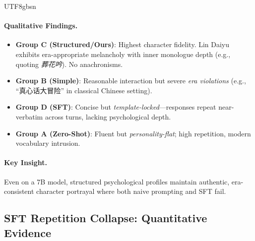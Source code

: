\documentclass[11pt]{article}
\begin{document}
\begin{CJK*}{UTF8}{gbsn}
\begin{table}[h]
\centering
\small
{}
\caption{Prompt engineering ablation on Qwen 7B. Response length in characters.}
\label{tab:prompt_ablation_full}
\end{table}

\paragraph{Qualitative Findings.}
\begin{itemize}
    \item \textbf{Group C (Structured/Ours)}: Highest character fidelity. Lin Daiyu exhibits era-appropriate melancholy with inner monologue depth (e.g., quoting \textit{葬花吟}). No anachronisms.
    \item \textbf{Group B (Simple)}: Reasonable interaction but severe \textit{era violations} (e.g., ``真心话大冒险'' in classical Chinese setting).
    \item \textbf{Group D (SFT)}: Concise but \textit{template-locked}---responses repeat near-verbatim across turns, lacking psychological depth.
    \item \textbf{Group A (Zero-Shot)}: Fluent but \textit{personality-flat}; high repetition, modern vocabulary intrusion.
\end{itemize}

\paragraph{Key Insight.} Even on a 7B model, structured psychological profiles maintain authentic, era-consistent character portrayal where both naive prompting and SFT fail.

\subsection{SFT Repetition Collapse: Quantitative Evidence}
\label{sec:sft_repetition}


\end{CJK*}
\end{document}

